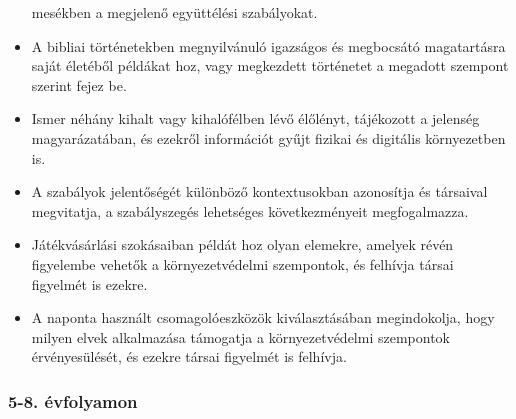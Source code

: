 \begin{itemize}
  mesékben a megjelenő együttélési szabályokat.
\item
  A bibliai történetekben megnyilvánuló igazságos és megbocsátó
  magatartásra saját életéből példákat hoz, vagy megkezdett történetet a
  megadott szempont szerint fejez be.
\item
  Ismer néhány kihalt vagy kihalófélben lévő élőlényt, tájékozott a
  jelenség magyarázatában, és ezekről információt gyűjt fizikai és
  digitális környezetben is.
\item
  A szabályok jelentőségét különböző kontextusokban azonosítja és
  társaival megvitatja, a szabályszegés lehetséges következményeit
  megfogalmazza.
\item
  Játékvásárlási szokásaiban példát hoz olyan elemekre, amelyek révén
  figyelembe vehetők a környezetvédelmi szempontok, és felhívja társai
  figyelmét is ezekre.
\item
  A naponta használt csomagolóeszközök kiválasztásában megindokolja,
  hogy milyen elvek alkalmazása támogatja a környezetvédelmi szempontok
  érvényesülését, és ezekre társai figyelmét is felhívja.
\end{itemize}

\hypertarget{evfolyamon-15}{%
\subsubsection{5-8. évfolyamon}\label{evfolyamon-15}}

